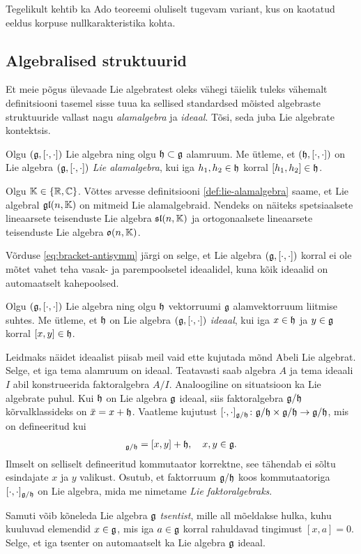 Tegelikult kehtib ka Ado teoreemi oluliselt tugevam variant,
kus on kaotatud eeldus korpuse nullkarakteristika
kohta.\cite{hochschild1966}

\subsection{Algebralised struktuurid}\label{subsec:algebralised-struktuurid}

Et meie põgus ülevaade Lie algebratest oleks vähegi täielik tuleks vähemalt
definitsiooni tasemel sisse tuua ka sellised standardsed mõisted algebraste
struktuuride vallast nagu \emph{alamalgebra} ja \emph{ideaal}. Tõsi, seda
juba Lie algebrate kontektsis.

\begin{dfn}\label{def:lie-alamalgebra}
    Olgu $(\mathfrak{g}, [\cdot, \cdot])$ Lie algebra ning olgu $\mathfrak{h} \subset \mathfrak{g}$ alamruum.
    Me ütleme, et $(\mathfrak{h}, [\cdot, \cdot])$ on Lie algebra $(\mathfrak{g}, [\cdot, \cdot])$
    \emph{Lie alamalgebra}, kui iga $h_1, h_2 \in \mathfrak{h}$ korral $[h_1, h_2] \in \mathfrak{h}$.
\end{dfn}

Olgu $\mathbb{K} \in \{\mathbb{R}, \mathbb{C}\}$. Võttes arvesse definitsiooni \ref{def:lie-alamalgebra}
saame, et Lie algebral $\mathfrak{gl}(n, \mathbb{K})$ on mitmeid Lie alamalgebraid. Nendeks on
näiteks spetsiaalsete lineaarsete teisenduste Lie algebra $\mathfrak{sl}(n, \mathbb{K})$
ja ortogonaalsete lineaarsete teisenduste Lie algebra $\mathfrak{o}(n, \mathbb{K})$.

Võrduse \eqref{eq:bracket-antisymm} järgi on selge, et Lie algebra
$(\mathfrak{g}, [\cdot, \cdot])$ korral ei ole mõtet vahet teha vasak- ja
parempoolsetel ideaalidel, kuna kõik ideaalid on automaatselt kahepoolsed.

\begin{dfn}
    Olgu $(\mathfrak{g}, [\cdot, \cdot])$ Lie algebra ning olgu $\mathfrak{h}$ vektorruumi $\mathfrak{g}$
    alamvektorruum liitmise suhtes. Me ütleme, et $\mathfrak{h}$ on Lie algebra
    $(\mathfrak{g}, [\cdot, \cdot])$ \emph{ideaal}, kui iga $x \in \mathfrak{h}$ ja $y \in \mathfrak{g}$ korral
    $[x, y] \in \mathfrak{h}$.
\end{dfn}

Leidmaks näidet ideaalist piisab meil vaid ette kujutada mõnd Abeli Lie algebrat.
Selge, et iga tema alamruum on ideaal. Teatavasti saab algebra $A$ ja tema ideaali
$I$ abil konstrueerida faktoralgebra $A / I$. Analoogiline
on situatsioon ka Lie algebrate puhul. Kui $\mathfrak{h}$ on Lie algebra $\mathfrak{g}$ ideaal,
siis faktoralgebra $\mathfrak{g} / \mathfrak{h}$ kõrvalklassideks on $\bar{x} = x + \mathfrak{h}$.
Vaatleme kujutust
$[\cdot, \cdot]_{\mathfrak{g} / \mathfrak{h}} \colon \mathfrak{g} / \mathfrak{h} \times \mathfrak{g} / \mathfrak{h} \to \mathfrak{g} / \mathfrak{h}$,
mis on defineeritud kui
\begin{align*}
    [x+\h, y+\h]_{\g / \h} = [x, y] + \h, \quad x, y \in \g.
\end{align*}
Ilmselt on selliselt defineeritud kommutaator korrektne, see tähendab ei sõltu
esindajate $x$ ja $y$ valikust. Osutub, et faktorruum $\mathfrak{g} / \mathfrak{h}$ koos
kommutaatoriga $[\cdot, \cdot]_{\mathfrak{g} / \mathfrak{h}}$ on Lie algebra, mida me
nimetame \emph{Lie faktoralgebraks}.

Samuti võib kõneleda Lie algebra $\mathfrak{g}$ \emph{tsentist}, mille all mõeldakse
hulka, kuhu kuuluvad elemendid $x \in \mathfrak{g}$, mis iga $a \in \mathfrak{g}$ korral rahuldavad
tingimust $[x, a] = 0$. Selge, et iga tsenter on automaatselt ka Lie algebra
$\mathfrak{g}$ ideaal.
